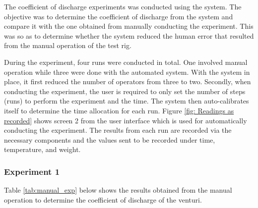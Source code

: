 The coefficient of discharge experiments was conducted using the system. The objective was to determine the coefficient of discharge from the system and compare it with the one obtained from manually conducting the experiment. This was so as to determine whether the system reduced the human error that resulted from the manual operation of the test rig. 
\par
During the experiment, four runs were conducted in total. One involved manual operation while three were done with the automated system.  With the system in place, it first reduced the number of operators from three to two. Secondly, when conducting the experiment, the user is required to only set the number of steps (runs) to perform the experiment and the time. The system then auto-calibrates itself to determine the time allocation for each run. Figure \ref{fig: Readings as recorded} shows screen 2 from the user interface which is used for automatically conducting the experiment. The results from each run are recorded via the necessary components and the values sent to be recorded under time, temperature, and weight. 
\subsubsection{Experiment 1}
Table \ref{tab:manual_exp} below shows the results obtained from the manual operation to determine the coefficient of discharge of the venturi.

